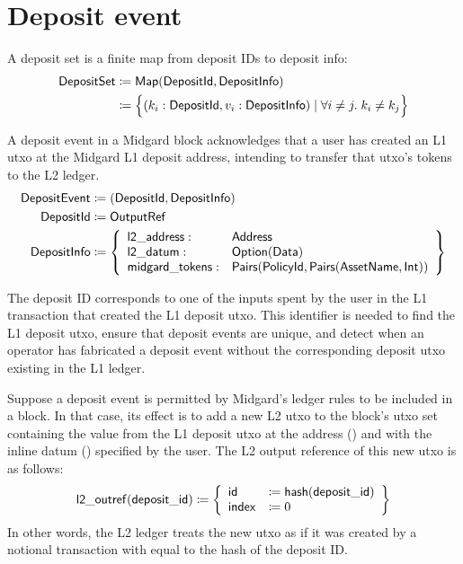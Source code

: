 \documentclass[../midgard.tex]{subfiles}
\begin{document}
\section{Deposit event}
\label{h:deposit-event}

A deposit set is a finite map from deposit IDs to deposit info:
\begin{align*}
    \mathsf{DepositSet} &\coloneq \mathsf{Map(DepositId, DepositInfo)} \\
      &\coloneq \Bigl\{
        (k_i: \mathsf{DepositId}, v_i: \mathsf{DepositInfo}) \mid \forall i \neq j.\; k_i \neq k_j
    \Bigr\}
\end{align*}

A deposit event in a Midgard block acknowledges that a user has created an L1 utxo at the Midgard L1 deposit address, intending to transfer that utxo's tokens to the L2 ledger.
\begin{align*}
    \mathsf{DepositEvent} &\coloneq (\mathsf{DepositId}, \mathsf{DepositInfo}) \\
    \mathsf{DepositId} &\coloneq \mathsf{OutputRef} \\
    \mathsf{DepositInfo} &\coloneq \left\{
        \begin{array}{ll}
            \mathsf{l2\_address} : & \mathsf{Address} \\
            \mathsf{l2\_datum} : & \mathsf{Option(Data)} \\
            \mathsf{midgard\_tokens} : & \mathsf{Pairs(PolicyId, Pairs(AssetName, Int))}
        \end{array} \right\}
\end{align*}

The deposit ID corresponds to one of the inputs spent by the user in the L1 transaction that created the L1 deposit utxo.
This identifier is needed to find the L1 deposit utxo, ensure that deposit events are unique, and detect when an operator has fabricated a deposit event without the corresponding deposit utxo existing in the L1 ledger.

Suppose a deposit event is permitted by Midgard's ledger rules to be included in a block.
In that case, its effect is to add a new L2 utxo to the block's utxo set containing the value from the L1 deposit utxo at the address () and with the inline datum () specified by the user.
The L2 output reference of this new utxo is as follows: 
\begin{equation*}
    \mathsf{l2\_outref(deposit\_id)} \coloneq \left\{
    \begin{array}{ll}
        \mathsf{id} &\coloneq \mathsf{hash(deposit\_id)} \\
        \mathsf{index} &\coloneq 0
    \end{array} \right\}
\end{equation*}
In other words, the L2 ledger treats the new utxo as if it was created by a notional transaction with  equal to the hash of the deposit ID.
\end{document}
